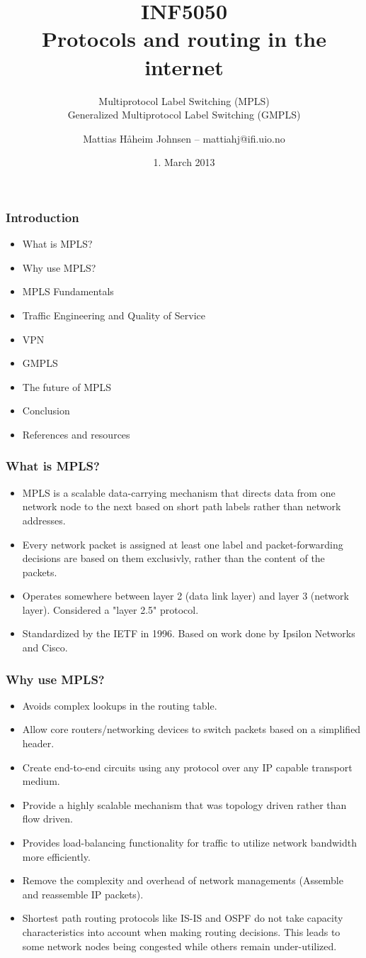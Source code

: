 \documentclass[12pt]{beamer}
\title[]{INF5050 \\ Protocols and routing in the internet}
\subtitle[]{Multiprotocol Label Switching (MPLS) \\ Generalized Multiprotocol Label Switching (GMPLS)}
\author{Mattias H{\aa}heim Johnsen -- mattiahj@ifi.uio.no}
\date{1. March 2013}
\begin{document}
\begin{frame}
    \titlepage
\end{frame}

\begin{frame}
  \frametitle{Introduction}
  \begin{itemize}
  \item What is MPLS?
  \item Why use MPLS?
  \item MPLS Fundamentals
  \item Traffic Engineering and Quality of Service
  \item VPN
  \item GMPLS
  \item The future of MPLS
  \item Conclusion
  \item References and resources
  \end{itemize}
\end{frame}

\begin{frame}
  \frametitle{What is MPLS?}
  \begin{itemize}
    \item MPLS is a scalable data-carrying mechanism that directs data from one network node to the next based on short path labels rather than network addresses.
    \item Every network packet is assigned at least one label and packet-forwarding decisions are based on them exclusivly, rather than the content of the packets.
    \item Operates somewhere between layer 2 (data link layer) and layer 3 (network layer). Considered a "layer 2.5" protocol.
    \item Standardized by the IETF in 1996. Based on work done by Ipsilon Networks and Cisco.
  \end{itemize}
\end{frame}

\begin{frame}
  \frametitle{Why use MPLS?}
  \begin{itemize}
    \item Avoids complex lookups in the routing table.
    \item Allow core routers/networking devices to switch packets based on a simplified header.
    \item Create end-to-end circuits using any protocol over any IP capable transport medium.
    \item Provide a highly scalable mechanism that was topology driven rather than flow driven.
    \item Provides load-balancing functionality for traffic to utilize network bandwidth more efficiently.
    \item Remove the complexity and overhead of network managements (Assemble and reassemble IP packets).       
    \item Shortest path routing protocols like IS-IS and OSPF do not take capacity characteristics into account when making routing decisions. This leads to some network nodes being congested while others remain under-utilized.
  \end{itemize}
\end{frame}
\end{document}
